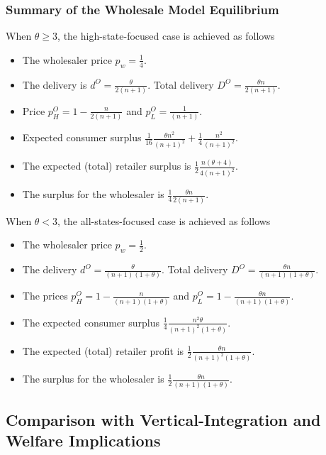 \documentclass[12pt]{article}
\begin{document}
\subsubsection{Summary of the Wholesale Model Equilibrium} 
When $\theta \geq 3$, the high-state-focused case is achieved as follows
\begin{itemize}
	\item The wholesaler price  $ p_w = \frac{1}{4}$. 
	\item The delivery is $d^O = \frac{\theta}{2(n + 1)}$. Total delivery $D^O = \frac{\theta n}{2(n + 1)}$. 
	\item Price $p_{H}^O = 1 - \frac{n}{2(n+1)}$ and $p_{L}^O = \frac{1}{(n+1)}$. 
	\item Expected consumer surplus $\frac{1}{16}\frac{\theta n^2}{(n + 1)^2} + \frac{1}{4}\frac{n^2}{(n + 1)^2}$. 
	\item The expected (total) retailer surplus is $\frac{1}{2}\frac{n(\theta + 4)}{4(n + 1)^2}$. 
	\item The surplus for the wholesaler is $\frac{1}{4}\frac{\theta n}{2(n + 1)}$.
\end{itemize}    



When $\theta < 3$, the all-states-focused case is achieved as follows
\begin{itemize}
	\item The wholesaler price $ p_w = \frac{1}{2}$. 
	\item The delivery $d^O = \frac{\theta}{(n + 1)(1+ \theta)}$. Total delivery $D^O = \frac{\theta n}{(n + 1)(1+ \theta)}$.
	\item The prices $p_{H}^O = 1 - \frac{n}{(n+1)(1+\theta)}$ and $p_{L}^O = 1 - \frac{\theta n}{(n + 1)(1+ \theta)}$.  
	\item The expected consumer surplus $\frac{1}{4} \frac{n^2\theta}{(n + 1)^2(1 + \theta)}$. 
	\item The expected (total) retailer profit is $\frac{1}{2}\frac{\theta n}{(n+1)^2(1 + \theta)} $. 
	\item The surplus for the wholesaler is $\frac{1}{2}\frac{\theta n}{(n + 1)(1+ \theta)}$.
\end{itemize}






\subsection{Comparison with Vertical-Integration and Welfare Implications}\label{sec:welfare_implication_wholesale_vi}
\end{document}
